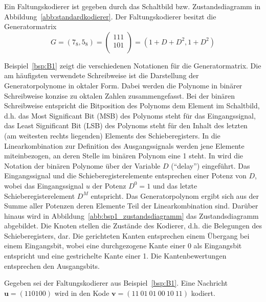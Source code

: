 \begin{beispiel} Ein Faltungskodierer ist gegeben durch das Schaltbild bzw. Zustandsdiagramm in Abbildung~\ref{abb:standardkodierer}. Der Faltungskodierer besitzt die Generatormatrix 
\begin{equation*}
G=\left(7_{8},5_{8}\right) = \begin{pmatrix}
111 \\
101 \\
\end{pmatrix} = \left(1+D+D^{2}, 1+D^{2} \right)
\end{equation*}
\label{bsp:B1}
\end{beispiel}
Beispiel~\ref{bsp:B1} zeigt die verschiedenen Notationen für die Generatormatrix. Die am häufigsten verwendete Schreibweise ist die Darstellung der Generatorpolynome in oktaler Form. Dabei werden die Polynome in binärer Schreibweise konzise zu oktalen Zahlen zusammengefasst. Bei der binären Schreibweise entspricht die Bitposition des Polynoms dem Element im Schaltbild, d.h. das Most Significant Bit (MSB) des Polynoms steht für das Eingangssignal, das Least Significant Bit (LSB) des Polynoms steht für den Inhalt des letzten (am weitesten rechts liegenden) Elements des Schieberegisters. In die Linearkombination zur Definition des Ausgangssignals werden jene Elemente miteinbezogen, an deren Stelle im binären Polynom eine 1 steht. In \cite{huffman2010fundamentals} wird die Notation der binären Polynome über der Variable $D$ (\enquote{delay}) eingeführt. Das Eingangssignal und die Schieberegisterelemente entsprechen einer Potenz von $D$, wobei das Eingangssignal $u$ der Potenz $D^{0}=1$ und das letzte Schieberegisterelement $D^{M}$ entspricht. Das Generatorpolynom ergibt sich aus der Summe aller Potenzen deren Elemente Teil der Linearkombination sind. Darüber hinaus wird in Abbildung~\ref{abb:bsp1_zustandsdiagramm} das Zustandsdiagramm abgebildet. Die Knoten stellen die Zustände des Kodierer, d.h. die Belegungen des Schieberegisters, dar. Die gerichteten Kanten entsprechen einem Übergang bei einem Eingangsbit, wobei eine durchgezogene Kante einer 0 als Eingangsbit entspricht und eine gestrichelte Kante einer 1. Die Kantenbewertungen entsprechen den Ausgangsbits.

\begin{beispiel} Gegeben sei der Faltungskodierer aus Beispiel~\ref{bsp:B1}. Eine Nachricht $\mathbf{u}=\left( 110100\right)$ wird in den Kode $\mathbf{v}=\left( 11~01~01~00~10~11\right)$ kodiert.
\label{bsp:B2}
\end{beispiel}

